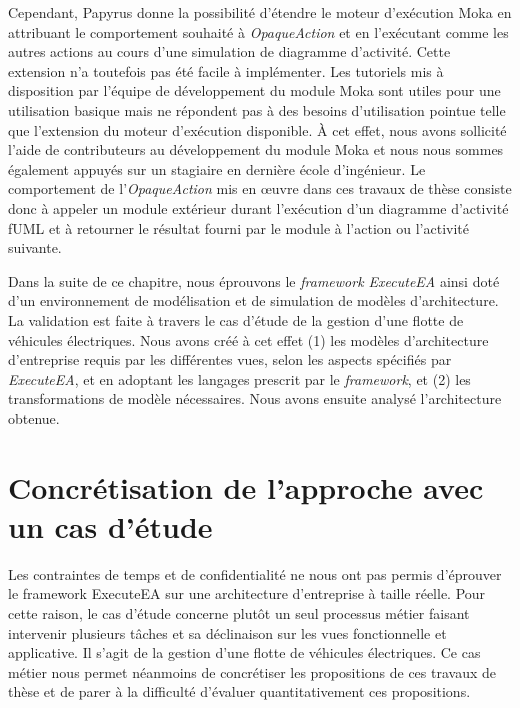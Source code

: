     Cependant, Papyrus donne la possibilité d'étendre le moteur d'exécution Moka
    en attribuant le comportement souhaité à \emph{OpaqueAction} et en
    l'exécutant comme les autres actions au cours d'une simulation de diagramme
    d'activité. Cette extension n'a toutefois pas été facile à implémenter. Les
    tutoriels mis à disposition par l'équipe de développement du module Moka
    sont utiles pour une utilisation basique mais ne répondent pas à des besoins
    d'utilisation pointue telle que l'extension du moteur d'exécution
    disponible. À cet effet, nous avons sollicité l'aide de contributeurs au
    développement du module Moka et nous nous sommes également appuyés sur un
    stagiaire en dernière école d'ingénieur. Le comportement de
    l'\emph{OpaqueAction} mis en œuvre dans ces travaux de thèse consiste donc à
    appeler un module extérieur durant l'exécution d'un diagramme d'activité
    fUML et à retourner le résultat fourni par le module à l'action ou
    l'activité suivante.

    Dans la suite de ce chapitre, nous éprouvons le \emph{framework ExecuteEA}
    ainsi doté d'un environnement de modélisation et de simulation de modèles
    d'architecture. La validation est faite à travers le cas d'étude de la
    gestion d'une flotte de véhicules électriques. Nous avons créé à cet effet
    (1) les modèles d'architecture d'entreprise requis par les différentes vues,
    selon les aspects spécifiés par \emph{ExecuteEA}, et en adoptant les langages
    prescrit par le \emph{framework}, et (2) les transformations de modèle
    nécessaires. Nous avons ensuite analysé l'architecture obtenue.


\section{Concrétisation de l'approche avec un cas d'étude}
\label{sec:concretisation_cas_metier}

    Les contraintes de temps et de confidentialité ne nous ont pas permis
    d'éprouver le framework ExecuteEA sur une architecture d'entreprise à taille
    réelle. Pour cette raison, le cas d'étude concerne plutôt un seul processus
    métier faisant intervenir plusieurs tâches et sa déclinaison sur les vues
    fonctionnelle et applicative. Il s'agit de la gestion d'une flotte de
    véhicules électriques. Ce cas métier nous permet néanmoins de concrétiser
    les propositions de ces travaux de thèse et de parer à la difficulté
    d'évaluer quantitativement ces propositions.

